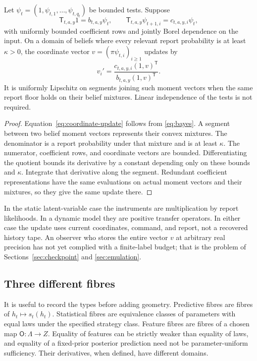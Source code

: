 \begin{proposition}\label{prop:coordinate-update}
Let $\psi_t=(1,\psi_{t,1},\ldots,\psi_{t,q_t})$ be bounded tests. Suppose
\[
 \mathsf T_{t,a,y}1=b_{t,a,y}\psi_t,
 \qquad
 \mathsf T_{t,a,y}\psi_{t+1,i}=c_{t,a,y,i}\psi_t,
\]
with uniformly bounded coefficient rows and jointly Borel dependence on the
input. On a domain of beliefs where every relevant report probability is
at least $\kappa>0$, the coordinate vector
$v=(\pi\psi_{t,i})_{i\ge1}$ updates by
\begin{equation}\label{eq:coordinate-update}
 v_i'=\frac{c_{t,a,y,i}(1,v)^{\mathsf T}}
 {b_{t,a,y}(1,v)^{\mathsf T}}.
\end{equation}
It is uniformly Lipschitz on segments joining such moment vectors when the
same report floor holds on their belief mixtures. Linear independence of
the tests is not required.
\end{proposition}
\begin{proof}
Equation~\eqref{eq:coordinate-update} follows from \eqref{eq:bayes}.
A segment between two belief moment vectors represents their convex
mixtures. The denominator is a report probability under that mixture and
is at least $\kappa$. The numerator, coefficient rows, and coordinate
vectors are bounded. Differentiating the quotient bounds its derivative
by a constant depending only on these bounds and $\kappa$. Integrate that
derivative along the segment. Redundant coefficient representations have
the same evaluations on actual moment vectors and their mixtures, so they
give the same update there.
\end{proof}

In the static latent-variable case the instruments are multiplication by
report likelihoods. In a dynamic model they are positive transfer
operators. In either case the update uses current coordinates, command,
and report, not a recovered history tape. An observer who stores the
entire vector $v$ at arbitrary real precision has not yet complied with a
finite-label budget; that is the problem of Sections~\ref{sec:checkpoint}
and \ref{sec:emulation}.

\subsection{Three different fibres}
It is useful to record the types before adding geometry. Predictive fibres
are fibres of $h_t\mapsto s_t(h_t)$. Statistical fibres are equivalence
classes of parameters with equal laws under the specified strategy class.
Feature fibres are fibres of a chosen map $\mathsf O:\Lambda\to Z$.
Equality of features can be strictly weaker than equality of laws, and
equality of a fixed-prior posterior prediction need not be parameter-uniform
sufficiency. Their derivatives, when defined, have different domains.
